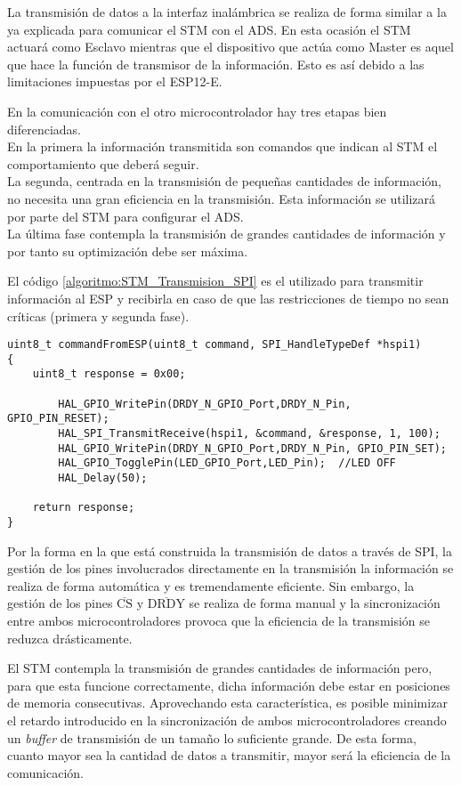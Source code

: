 La transmisión de datos a la interfaz inalámbrica se realiza de forma similar a la ya explicada para comunicar el STM con el ADS. En esta ocasión el STM actuará como Esclavo mientras que el dispositivo que actúa como Master es aquel que hace la función de transmisor de la información. Esto es así debido a las limitaciones impuestas por el ESP12-E. 

En la comunicación con el otro microcontrolador hay tres etapas bien diferenciadas.\\
En la primera la información transmitida son comandos que indican al STM el comportamiento que deberá seguir.\\
La segunda, centrada en la transmisión de pequeñas cantidades de información, no necesita una gran eficiencia en la transmisión. Esta información se utilizará por parte del STM para configurar el ADS.\\
La última fase contempla la transmisión de grandes cantidades de información y por tanto su optimización debe ser máxima.

El código \ref{algoritmo:STM_Transmision_SPI} es el utilizado para transmitir información al ESP y recibirla en caso de que las restricciones de tiempo no sean críticas (primera y segunda fase).

\begin{lstlisting}[label=algoritmo:STM_Transmision_SPI,style = STM-code,frame=single,caption=Transmisión de datos a través de SPI con el STM]
uint8_t commandFromESP(uint8_t command, SPI_HandleTypeDef *hspi1)
{
	uint8_t response = 0x00;	

		HAL_GPIO_WritePin(DRDY_N_GPIO_Port,DRDY_N_Pin, GPIO_PIN_RESET);
		HAL_SPI_TransmitReceive(hspi1, &command, &response, 1, 100);
		HAL_GPIO_WritePin(DRDY_N_GPIO_Port,DRDY_N_Pin, GPIO_PIN_SET);
		HAL_GPIO_TogglePin(LED_GPIO_Port,LED_Pin); 	//LED OFF
		HAL_Delay(50);
	
	return response;
}
\end{lstlisting}

Por la forma en la que está construida la transmisión de datos a través de SPI, la gestión de los pines involucrados directamente en la transmisión la información se realiza de forma automática y es tremendamente eficiente. Sin embargo, la gestión de los pines $\overline{\text{CS}}$ y $\overline{\text{DRDY}}$ se realiza de forma manual y la sincronización entre ambos microcontroladores provoca que la eficiencia de la transmisión se reduzca drásticamente. 

El STM contempla la transmisión de grandes cantidades de información pero, para que esta funcione correctamente, dicha información debe estar en posiciones de memoria consecutivas. Aprovechando esta característica, es posible minimizar el retardo introducido en la sincronización de ambos microcontroladores creando un \textit{buffer} de transmisión de un tamaño lo suficiente grande. De esta forma, cuanto mayor sea la cantidad de datos a transmitir, mayor será la eficiencia de la comunicación.

